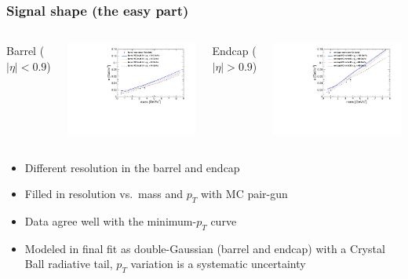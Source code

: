 \documentclass[compress]{beamer}
\begin{document}
\begin{frame}
\frametitle{Signal shape (the easy part)}

\vfill
\begin{columns}
\centering Barrel ($|\eta| < 0.9$)

\includegraphics[width=\linewidth]{resolution_barrel.pdf}

\centering Endcap ($|\eta| > 0.9$)

\includegraphics[width=\linewidth]{resolution_endcap.pdf}
\end{columns}

\begin{itemize}
\item Different resolution in the barrel and endcap
\item Filled in resolution vs.\ mass and $p_T$ with MC pair-gun
\item Data agree well with the minimum-$p_T$ curve
\item Modeled in final fit as double-Gaussian (barrel and endcap) with
  a Crystal Ball radiative tail, $p_T$ variation is a systematic uncertainty
\end{itemize}
\end{frame}
\end{document}
